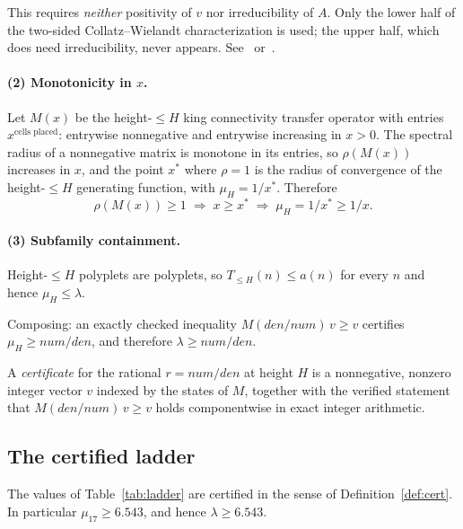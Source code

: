 \documentclass[11pt]{article}
\newcommand{\rhoo}{\rho}
\begin{document}
This requires \emph{neither} positivity of $v$ nor
irreducibility of $A$. Only the lower half of the two-sided Collatz--Wielandt
characterization is used; the upper half, which does need irreducibility, never
appears. See~\cite[Ch.~8]{hornJohnson2013} or~\cite[Ch.~2]{bermanPlemmons1994}.

\paragraph{(2) Monotonicity in $x$.} Let $M(x)$ be the height-$\le H$ king
connectivity transfer operator with entries $x^{\text{cells placed}}$: entrywise
nonnegative and entrywise increasing in $x > 0$. The spectral radius of a
nonnegative matrix is monotone in its entries, so $\rhoo(M(x))$ increases in $x$,
and the point $x^*$ where $\rhoo = 1$ is the radius of convergence of the
height-$\le H$ generating function, with $\mu_H = 1/x^*$. Therefore
\[
  \rhoo(M(x)) \ge 1 \;\Longrightarrow\; x \ge x^*
             \;\Longrightarrow\; \mu_H = 1/x^* \ge 1/x .
\]

\paragraph{(3) Subfamily containment.} Height-$\le H$ polyplets are polyplets, so
$T_{\le H}(n) \le a(n)$ for every $n$ and hence $\mu_H \le \lambda$.

Composing: an exactly checked inequality $M(\mathit{den}/\mathit{num})\,v \ge v$
certifies $\mu_H \ge \mathit{num}/\mathit{den}$, and therefore
$\lambda \ge \mathit{num}/\mathit{den}$.

\begin{definition}[certificate]
\label{def:cert}
A \emph{certificate} for the rational $r = \mathit{num}/\mathit{den}$ at height
$H$ is a nonnegative, nonzero integer vector $v$ indexed by the states of
$M$, together with the verified statement that
$M(\mathit{den}/\mathit{num})\,v \ge v$ holds componentwise in exact integer
arithmetic.
\end{definition}

\subsection{The certified ladder}

\begin{theorem}
\label{thm:ladder}
The values of Table~\ref{tab:ladder} are certified in the sense of
Definition~\ref{def:cert}. In particular $\mu_{17} \ge 6.543$, and hence
$\lambda \ge 6.543$.
\end{theorem}
\end{document}
